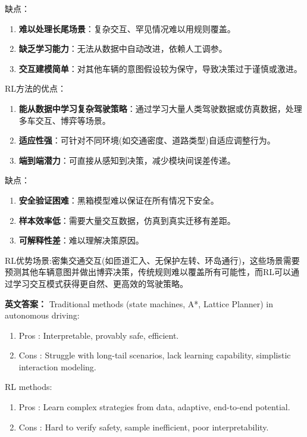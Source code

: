 \documentclass[10pt,a4paper]{ctexart}
\begin{document}
缺点：
\begin{enumerate}
    \item \textbf{难以处理长尾场景}：复杂交互、罕见情况难以用规则覆盖。
    \item \textbf{缺乏学习能力}：无法从数据中自动改进，依赖人工调参。
    \item \textbf{交互建模简单}：对其他车辆的意图假设较为保守，导致决策过于谨慎或激进。
\end{enumerate}

RL方法的优点：
\begin{enumerate}
    \item \textbf{能从数据中学习复杂驾驶策略}：通过学习大量人类驾驶数据或仿真数据，处理多车交互、博弈等场景。
    \item \textbf{适应性强}：可针对不同环境(如交通密度、道路类型)自适应调整行为。
    \item \textbf{端到端潜力}：可直接从感知到决策，减少模块间误差传递。
\end{enumerate}

缺点：
\begin{enumerate}
    \item \textbf{安全验证困难}：黑箱模型难以保证在所有情况下安全。
    \item \textbf{样本效率低}：需要大量交互数据，仿真到真实迁移有差距。
    \item \textbf{可解释性差}：难以理解决策原因。
\end{enumerate}

 RL优势场景:密集交通交互(如匝道汇入、无保护左转、环岛通行)，这些场景需要预测其他车辆意图并做出博弈决策，传统规则难以覆盖所有可能性，而RL可以通过学习交互模式获得更自然、更高效的驾驶策略。

\textbf{英文答案：}  
Traditional methods (state machines, A*, Lattice Planner) in autonomous driving:
\begin{enumerate}
    \item Pros : Interpretable, provably safe, efficient.
    \item Cons : Struggle with long-tail scenarios, lack learning capability, simplistic interaction modeling.
\end{enumerate}

RL methods:
\begin{enumerate}
    \item Pros : Learn complex strategies from data, adaptive, end-to-end potential.
    \item Cons : Hard to verify safety, sample inefficient, poor interpretability.
\end{enumerate}
\end{document}
